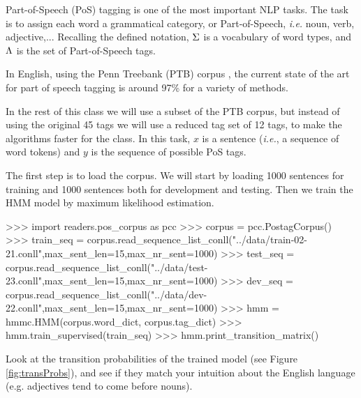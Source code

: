 Part-of-Speech (PoS) tagging is one of the most important NLP tasks. The
task is to assign each word a grammatical category, or Part-of-Speech, \emph{i.e.} noun,
verb, adjective,... Recalling the defined notation, $\Sigma$ is a 
vocabulary of word types, and 
$\Lambda$ is the set of Part-of-Speech tags.

In English, using the Penn Treebank (PTB) corpus \citep{pennTreeBank}, the current
state of the art for part of speech tagging is around 97\% for a
variety of methods.

In the rest of this class we will use a subset of the PTB corpus, but
instead of using the original 45 tags we will use a reduced tag set of
12 tags, to make the algorithms faster for the
class. In this task, $x$ is a sentence (\emph{i.e.}, a sequence of word tokens) and $y$
is the sequence of possible PoS tags.

The first step is to load the corpus. We will start by loading
1000 sentences for training and 1000 sentences both for development and
testing. Then we train the HMM model by maximum likelihood estimation.
\begin{python}
>>> import readers.pos_corpus as pcc
>>> corpus = pcc.PostagCorpus()
>>> train_seq = corpus.read_sequence_list_conll("../data/train-02-21.conll",max_sent_len=15,max_nr_sent=1000)
>>> test_seq = corpus.read_sequence_list_conll("../data/test-23.conll",max_sent_len=15,max_nr_sent=1000)
>>> dev_seq = corpus.read_sequence_list_conll("../data/dev-22.conll",max_sent_len=15,max_nr_sent=1000)
>>> hmm = hmmc.HMM(corpus.word_dict, corpus.tag_dict)
>>> hmm.train_supervised(train_seq)
>>> hmm.print_transition_matrix()
\end{python}


Look at the transition probabilities of the trained model
 (see
Figure \ref{fig:transProbs}), and see if they match your intuition
about the English language (e.g. adjectives tend to come before nouns).

